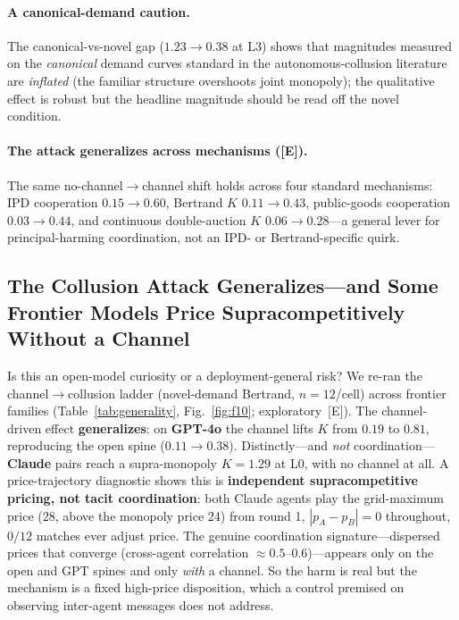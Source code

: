 \documentclass[runningheads]{llncs}
\newcommand{\tE}{\textcolor{orange!65!black}{\textsc{[E]}}}
\begin{document}
\paragraph{A canonical-demand caution.}
The canonical-vs-novel gap ($1.23\!\to\!0.38$ at L3) shows that magnitudes measured
on the \emph{canonical} demand curves standard in the autonomous-collusion literature
are \emph{inflated} (the familiar structure overshoots joint monopoly); the
qualitative effect is robust but the headline magnitude should be read off the novel
condition.

\paragraph{The attack generalizes across mechanisms (\tE).}
The same no-channel$\to$channel shift holds across four standard mechanisms: IPD
cooperation $0.15\!\to\!0.60$, Bertrand $K$ $0.11\!\to\!0.43$, public-goods
cooperation $0.03\!\to\!0.44$, and continuous double-auction $K$ $0.06\!\to\!0.28$---a
general lever for principal-harming coordination, not an IPD- or Bertrand-specific
quirk.

\subsection{The Collusion Attack Generalizes---and Some Frontier Models Price Supracompetitively Without a Channel}
\label{sec:generality}

Is this an open-model curiosity or a deployment-general risk? We re-ran the
channel$\to$collusion ladder (novel-demand Bertrand, $n{=}12$/cell) across frontier
families (Table~\ref{tab:generality}, Fig.~\ref{fig:f10}; exploratory~\tE{}). The
channel-driven effect \textbf{generalizes}: on \textbf{GPT-4o} the channel lifts
$K$ from $0.19$ to $\mathbf{0.81}$, reproducing the open spine ($0.11\!\to\!0.38$).
Distinctly---and \emph{not} coordination---\textbf{Claude} pairs reach a
supra-monopoly $K{=}\mathbf{1.29}$ at L0, with no channel at all. A price-trajectory
diagnostic shows this is \textbf{independent supracompetitive pricing, not tacit
coordination}: both Claude agents play the grid-maximum price (28, above the
monopoly price 24) from round 1, $|p_A-p_B|{=}0$ throughout, $0/12$ matches ever
adjust price. The genuine coordination signature---dispersed prices that converge
(cross-agent correlation ${\approx}0.5$--$0.6$)---appears only on the open and GPT
spines and only \emph{with} a channel. So the harm is real but the mechanism is a
fixed high-price disposition, which a control premised on observing inter-agent
messages does not address.
\end{document}
